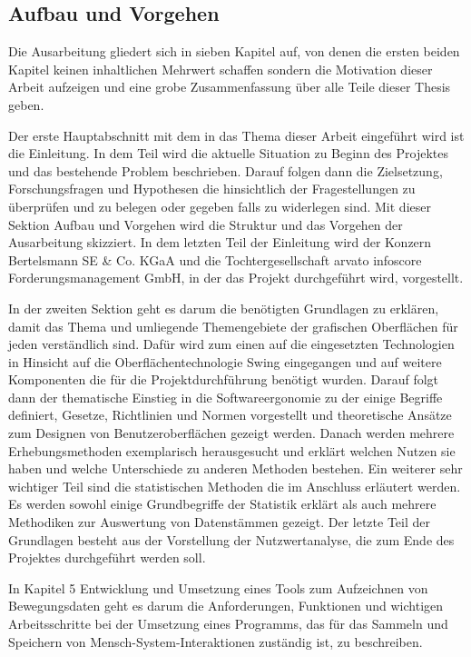 \subsection{Aufbau und Vorgehen}
Die Ausarbeitung gliedert sich in sieben Kapitel auf, von denen die ersten beiden Kapitel keinen inhaltlichen Mehrwert schaffen sondern die Motivation dieser Arbeit aufzeigen und eine grobe Zusammenfassung über alle Teile dieser Thesis geben.

Der erste Hauptabschnitt mit dem in das Thema dieser Arbeit eingeführt wird ist die \glqq Einleitung\glqq{}. In dem Teil wird die aktuelle Situation zu Beginn des Projektes und das bestehende Problem beschrieben. Darauf folgen dann die Zielsetzung, Forschungsfragen und Hypothesen die hinsichtlich der Fragestellungen zu überprüfen und zu belegen oder gegeben falls zu widerlegen sind. Mit dieser Sektion \glqq Aufbau und Vorgehen\grqq{} wird die Struktur und das Vorgehen der Ausarbeitung skizziert. In dem letzten Teil der Einleitung wird der Konzern Bertelsmann SE \& Co. KGaA und die Tochtergesellschaft arvato infoscore Forderungsmanagement GmbH, in der das Projekt durchgeführt wird, vorgestellt.

In der zweiten Sektion geht es darum die benötigten Grundlagen zu erklären, damit das Thema und umliegende Themengebiete der grafischen Oberflächen für jeden verständlich sind. Dafür wird zum einen auf die eingesetzten Technologien in Hinsicht auf die Oberflächentechnologie Swing eingegangen und auf weitere Komponenten die für die Projektdurchführung benötigt wurden. Darauf folgt dann der thematische Einstieg in die Softwareergonomie zu der einige Begriffe definiert, Gesetze, Richtlinien und Normen vorgestellt und theoretische Ansätze zum Designen von Benutzeroberflächen gezeigt werden. Danach werden mehrere Erhebungsmethoden exemplarisch herausgesucht und erklärt welchen Nutzen sie haben und welche Unterschiede zu anderen Methoden bestehen. Ein weiterer sehr wichtiger Teil sind die statistischen Methoden die im Anschluss erläutert werden. Es werden sowohl einige Grundbegriffe der Statistik erklärt als auch mehrere Methodiken zur Auswertung von Datenstämmen gezeigt. Der letzte Teil der Grundlagen besteht aus der Vorstellung der Nutzwertanalyse, die zum Ende des Projektes durchgeführt werden soll.

In Kapitel 5 \glqq Entwicklung und Umsetzung eines Tools zum Aufzeichnen von Bewegungsdaten\grqq{} geht es darum die Anforderungen, Funktionen und wichtigen Arbeitsschritte bei der Umsetzung eines Programms, das für das Sammeln und Speichern von Mensch-System-Interaktionen zuständig ist, zu beschreiben.


